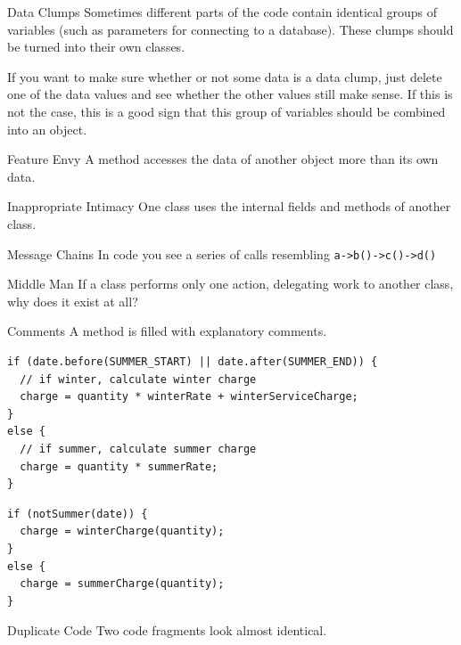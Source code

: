 \documentclass{beamer}
\begin{document}
\begin{frame}{Data Clumps}
Sometimes different parts of the code contain identical groups of variables
(such as parameters for connecting to a database). These clumps should be turned
into their own classes. 

If you want to make sure whether or not some data is a data clump, just delete
one of the data values and see whether the other values still make sense. If
this is not the case, this is a good sign that this group of variables should be
combined into an object.
\end{frame}

\begin{frame}{Feature Envy}
A method accesses the data of another object more than its own data.
\end{frame}

\begin{frame}{Inappropriate Intimacy}
One class uses the internal fields and methods of another class.
\end{frame}

\begin{frame}{Message Chains}
In code you see a series of calls resembling \lstinline{a->b()->c()->d()}
\end{frame}

\begin{frame}{Middle Man}
If a class performs only one action, delegating work to another class, why does
it exist at all?
\end{frame}

\begin{frame}[fragile]{Comments}
A method is filled with explanatory comments.
\begin{lstlisting}
if (date.before(SUMMER_START) || date.after(SUMMER_END)) {
  // if winter, calculate winter charge
  charge = quantity * winterRate + winterServiceCharge;
}
else {
  // if summer, calculate summer charge
  charge = quantity * summerRate;
}
\end{lstlisting}

\begin{lstlisting}
if (notSummer(date)) {
  charge = winterCharge(quantity);
}
else {
  charge = summerCharge(quantity);
}
\end{lstlisting}
\end{frame}

\begin{frame}{Duplicate Code}
Two code fragments look almost identical.
\end{frame}
\end{document}
